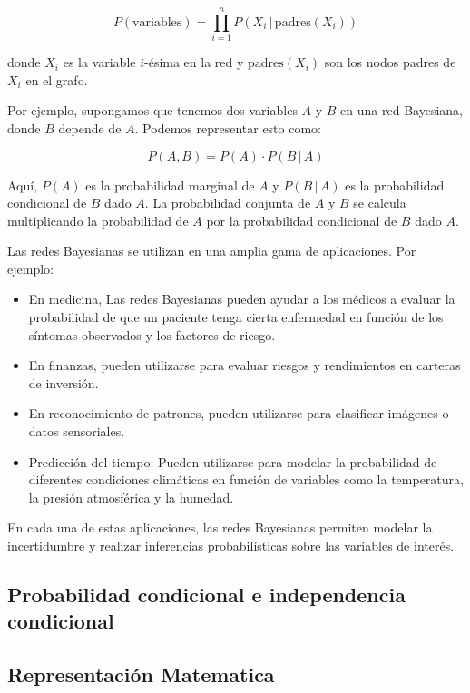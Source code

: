 \[
P(\text{{variables}}) = \prod_{i=1}^{n} P(X_i \,|\, \text{{padres}}(X_i))
\]

donde \( X_i \) es la variable \( i \)-ésima en la red y \( \text{{padres}}(X_i) \) son los nodos padres de \( X_i \) en el grafo.

Por ejemplo, supongamos que tenemos dos variables \( A \) y \( B \) en una red Bayesiana, donde \( B \) depende de \( A \). Podemos representar esto como:

\[
P(A, B) = P(A) \cdot P(B \,|\, A)
\]

Aquí, \( P(A) \) es la probabilidad marginal de \( A \) y \( P(B \,|\, A) \) es la probabilidad condicional de \( B \) dado \( A \). La probabilidad conjunta de \( A \) y \( B \) se calcula multiplicando la probabilidad de \( A \) por la probabilidad condicional de \( B \) dado \( A \).

Las redes Bayesianas se utilizan en una amplia gama de aplicaciones. Por ejemplo:

\begin{itemize}
    \item  En medicina, Las redes Bayesianas pueden ayudar a los médicos a evaluar la probabilidad de que un paciente tenga cierta enfermedad en función de los síntomas observados y los factores de riesgo.
    \item En finanzas, pueden utilizarse para evaluar riesgos y rendimientos en carteras de inversión.
    \item En reconocimiento de patrones, pueden utilizarse para clasificar imágenes o datos sensoriales.

    \item Predicción del tiempo: Pueden utilizarse para modelar la probabilidad de diferentes condiciones climáticas en función de variables como la temperatura, la presión atmosférica y la humedad.

\end{itemize}
En cada una de estas aplicaciones, las redes Bayesianas permiten modelar la incertidumbre y realizar inferencias probabilísticas sobre las variables de interés.

\subsection*{Probabilidad condicional e independencia condicional}


\subsection*{Representación Matematica}

